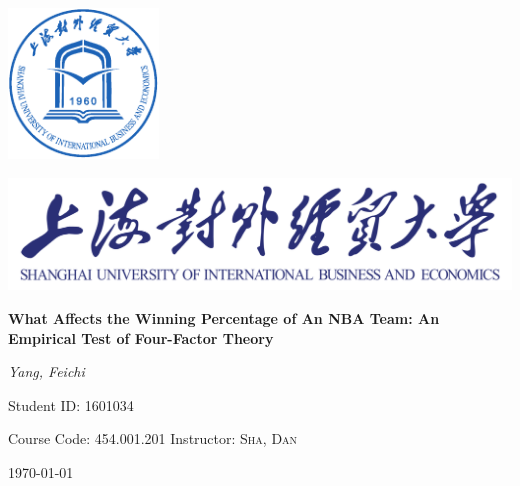 \documentclass[12pt, a4paper]{article}
\begin{document}
\begin{spacing}{1.5}
\begin{titlepage}
	\centering
	\includegraphics[width=0.3\textwidth]{logo.pdf}\par
	\vspace{0.8cm}
	\includegraphics[width=1.0\textwidth]{sf.png}\par
	\vspace{1.5cm}
	{\huge\bfseries What Affects the Winning Percentage of An NBA Team: An Empirical Test of Four-Factor Theory\par}
	\vspace{4cm}
	{\Large\itshape Yang, Feichi\par}
	\vfill
	{Student ID: 1601034}\par
	\vfill
	{Course Code: 454.001.201}
	\vfill
	Instructor:	\textsc{Sha, Dan}
	\vfill
	{\large \today\par}
\end{titlepage}
\setmainfont{Times}
\setsansfont{Times} 
\linespread{2}
\begin{abstract}
The aim of this paper is to study the factors that affect the winning percentage for each team in the National Basketball Association (NBA). Four potential factors, which are, effective field goal percentage, turnover ratio, free throw attempt rate and offensive rebound percentage, are considered according to John Schuhmann’s blog. In this paper, three samples with 30 records each dating back to the Regular Season 2015-2016 are collected from the NBA official statistic website. Before a linear regression model to illustrate the relationship is developed, two dummy variables are introduced to the model to make a distinction among seasons and a Wald test is used to ensure that the Regular Season itself as an exogenous factor will not affect the winning percentage. We finally find that a team's field goal percentage, the frequency of a team goes to the free throw line and the ability to grab offensive rebounds are three positive factors toward winning percentage, meanwhile, the rate of turnovers a team averages is negatively related to the winning percentage.
\par
~\\
\noindent
\textbf{Keywords:} Linear regression, Shapiro-Wilk Test, Wald Test, White Test
\end{abstract}
\newpage
\tableofcontents
\newpage

\end{spacing}
\end{document}
